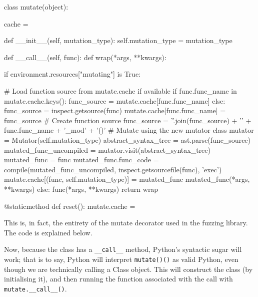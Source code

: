 \begin{pyglist}[language = python, encoding = utf8, caption={The "mutate" decorator}, listingname=\textbf{Code Sample}, listingname=\textbf{Code Sample}, numbers=left]
class mutate(object):

    cache = {}

    def __init__(self, mutation_type):
        self.mutation_type = mutation_type

    def __call__(self, func):
        def wrap(*args, **kwargs):

            if environment.resources["mutating"] is True:

                # Load function source from mutate.cache if available
                if func.func_name in mutate.cache.keys():
                    func_source = mutate.cache[func.func_name]
                else:
                    func_source = inspect.getsource(func)
                    mutate.cache[func.func_name] = func_source
                # Create function source
                func_source = ''.join(func_source) + '\n' + func.func_name + '_mod' + '()'
                # Mutate using the new mutator class
                mutator = Mutator(self.mutation_type)
                abstract_syntax_tree = ast.parse(func_source)
                mutated_func_uncompiled = mutator.visit(abstract_syntax_tree)
                mutated_func = func
                mutated_func.func_code = compile(mutated_func_uncompiled, inspect.getsourcefile(func), 'exec')
                mutate.cache[(func, self.mutation_type)] = mutated_func
                mutated_func(*args, **kwargs)
            else:
                func(*args, **kwargs)
        return wrap

    @staticmethod
    def reset():
        mutate.cache = {}
\end{pyglist} \par

This is, in fact, the entirety of the mutate decorator used in the fuzzing library. The code is explained below. \par

Now, because the class has a \texttt{\_\_call\_\_} method, Python's syntactic sugar will work; that is to say, Python will interpret \texttt{mutate()()} as valid Python, even though we are technically calling a Class object. This will construct the class (by initialising it), and then running the function associated with the call with \texttt{mutate.\_\_call\_\_()}. \par

